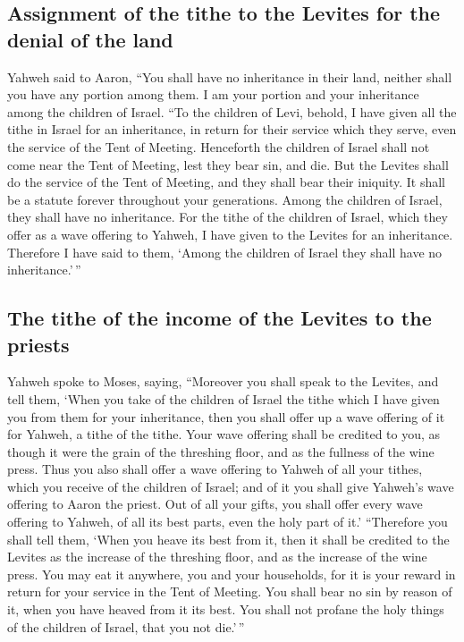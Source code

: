 \hypertarget{assignment-of-the-tithe-to-the-levites-for-the-denial-of-the-land}{%
\subsection{Assignment of the tithe to the Levites for the denial of the
land}\label{assignment-of-the-tithe-to-the-levites-for-the-denial-of-the-land}}

 Yahweh said to Aaron, ``You shall have no inheritance in
their land, neither shall you have any portion among them. I am your
portion and your inheritance among the children of Israel.
 ``To the children of Levi, behold, I have given all the
tithe in Israel for an inheritance, in return for their service which
they serve, even the service of the Tent of Meeting. 
Henceforth the children of Israel shall not come near the Tent of
Meeting, lest they bear sin, and die.  But the Levites
shall do the service of the Tent of Meeting, and they shall bear their
iniquity. It shall be a statute forever throughout your generations.
Among the children of Israel, they shall have no inheritance.
 For the tithe of the children of Israel, which they
offer as a wave offering to Yahweh, I have given to the Levites for an
inheritance. Therefore I have said to them, `Among the children of
Israel they shall have no inheritance.'\,''

\hypertarget{the-tithe-of-the-income-of-the-levites-to-the-priests}{%
\subsection{The tithe of the income of the Levites to the
priests}\label{the-tithe-of-the-income-of-the-levites-to-the-priests}}

 Yahweh spoke to Moses, saying, 
``Moreover you shall speak to the Levites, and tell them, `When you take
of the children of Israel the tithe which I have given you from them for
your inheritance, then you shall offer up a wave offering of it for
Yahweh, a tithe of the tithe.  Your wave offering shall
be credited to you, as though it were the grain of the threshing floor,
and as the fullness of the wine press.  Thus you also
shall offer a wave offering to Yahweh of all your tithes, which you
receive of the children of Israel; and of it you shall give Yahweh's
wave offering to Aaron the priest.  Out of all your
gifts, you shall offer every wave offering to Yahweh, of all its best
parts, even the holy part of it.'  ``Therefore you shall
tell them, `When you heave its best from it, then it shall be credited
to the Levites as the increase of the threshing floor, and as the
increase of the wine press.  You may eat it anywhere, you
and your households, for it is your reward in return for your service in
the Tent of Meeting.  You shall bear no sin by reason of
it, when you have heaved from it its best. You shall not profane the
holy things of the children of Israel, that you not die.'\,''

